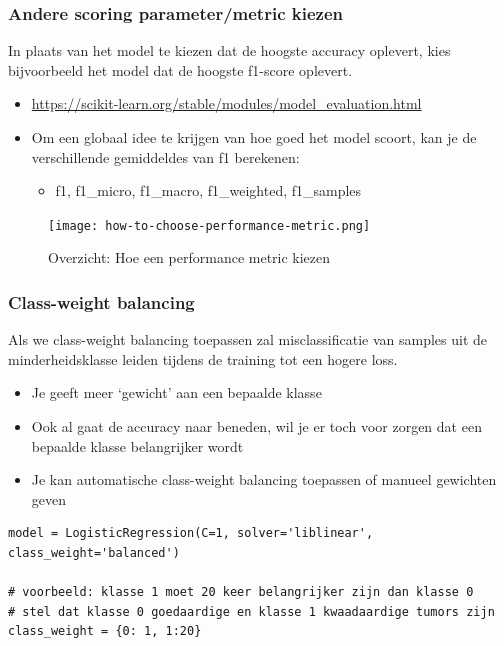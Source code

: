 \documentclass{article}
\begin{document}
\subsubsection{Andere scoring parameter/metric kiezen}

In plaats van het model te kiezen dat de hoogste accuracy oplevert, kies bijvoorbeeld het model dat de hoogste f1-score oplevert.

\begin{itemize}
    \item \url{https://scikit-learn.org/stable/modules/model_evaluation.html}
    \item Om een globaal idee te krijgen van hoe goed het model scoort, kan je de verschillende gemiddeldes van f1 berekenen:
    \begin{itemize}
        \item f1, f1\_micro, f1\_macro, f1\_weighted, f1\_samples
    \end{itemize}
\end{itemize}

\begin{figure}[H]
    \centering
    \texttt{[image: how-to-choose-performance-metric.png]}
    \caption{Overzicht: Hoe een performance metric kiezen}
\end{figure}


\subsubsection{Class-weight balancing}

Als we class-weight balancing toepassen zal misclassificatie van samples uit de minderheidsklasse leiden tijdens de training tot een hogere loss.

\begin{itemize}
    \item Je geeft meer `gewicht' aan een bepaalde klasse
    \item Ook al gaat de accuracy naar beneden, wil je er toch voor zorgen dat een bepaalde klasse belangrijker wordt
    \item Je kan automatische class-weight balancing toepassen of manueel gewichten geven
\end{itemize}

\begin{verbatim}
model = LogisticRegression(C=1, solver='liblinear', class_weight='balanced')

# voorbeeld: klasse 1 moet 20 keer belangrijker zijn dan klasse 0
# stel dat klasse 0 goedaardige en klasse 1 kwaadaardige tumors zijn
class_weight = {0: 1, 1:20}
\end{verbatim}
\end{document}
